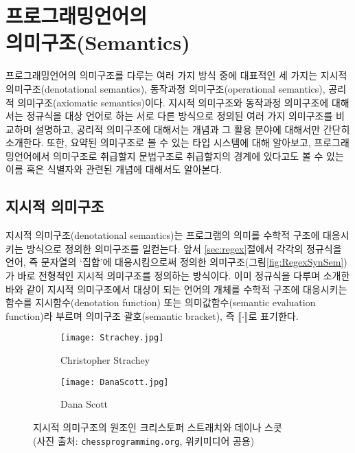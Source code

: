 \chapter[프로그래밍언어의 의미구조(Semantics)]{프로그래밍언어의\\의미구조(Semantics)}

프로그래밍언어의 의미구조를 다루는 여러 가지 방식 중에 대표적인
세 가지는 지시적 의미구조(denotational semantics),
동작과정 의미구조(operational semantics),
공리적 의미구조(axiomatic semantics)이다.
지시적 의미구조와 동작과정 의미구조에 대해서는 정규식을 대상 언어로 하는
서로 다른 방식으로 정의된 여러 가지 의미구조를 비교하며 설명하고,
공리적 의미구조에 대해서는 개념과 그 활용 분야에 대해서만 간단히 소개한다.
또한, 요약된 의미구조로 볼 수 있는 타입 시스템에 대해 알아보고,
프로그래밍언어에서 의미구조로 취급할지 문법구조로 취급할지의 경계에
있다고도 볼 수 있는 이름 혹은 식별자와 관련된 개념에 대해서도 알아본다.

\newpage

\section{지시적 의미구조}
지시적 의미구조(denotational semantics)는 프로그램의 의미를 수학적 구조에
대응시키는 방식으로 정의한 의미구조를 일컫는다. 앞서 \ref{sec:regex}절에서
각각의 정규식을 언어, 즉 문자열의 `집합'에 대응시킴으로써 정의한 
의미구조(그림\;\ref{fig:RegexSynSem})가 바로 전형적인 지시적 의미구조를
정의하는 방식이다. 이미 정규식을 다루며 소개한 바와 같이 지시적 의미구조에서
대상이 되는 언어의 개체를 수학적 구조에 대응시키는 함수를 지시함수(denotation function)
또는 의미값함수(semantic evaluation function)라 부르며 의미구조 괄호(semantic bracket),
즉 $\llbracket\cdot\rrbracket$로 표기한다.

\begin{figure}\centering
\begin{subfigure}{.3\textwidth}\centering\vspace*{-2ex}
\texttt{[image: Strachey.jpg]}
\caption{Christopher Strachey}
\end{subfigure}
\qquad\qquad
\begin{subfigure}{.3\textwidth}\centering\vspace*{-2ex}
\texttt{[image: DanaScott.jpg]}
\caption{Dana Scott}
\end{subfigure}
\caption{지시적 의미구조의 원조인
         크리스토퍼 스트래치와 데이나 스콧 \\
         {\footnotesize(사진 출처:
              \texttt{chessprogramming.org}, 위키미디어 공용)}
	 \label{fig:StracheyScott} }
\end{figure}


